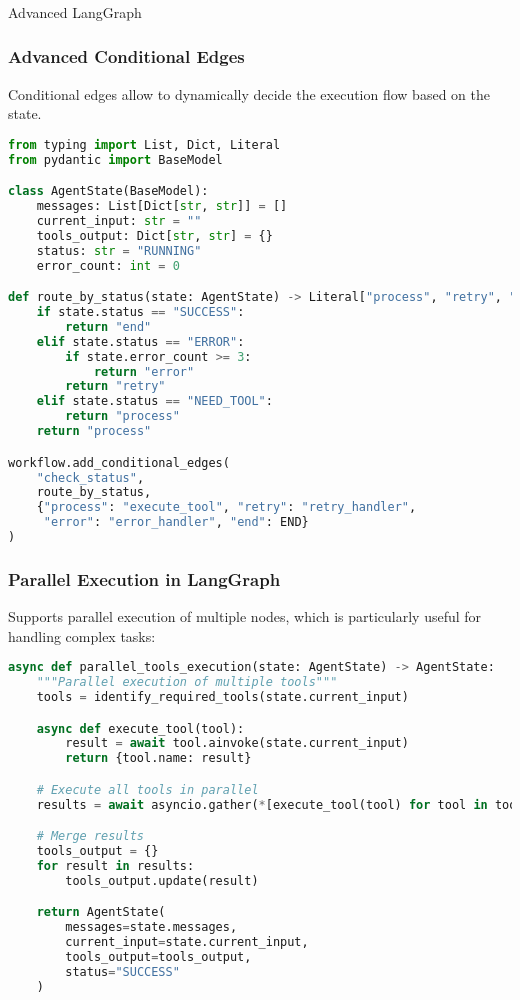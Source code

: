 \begin{frame}[fragile]\frametitle{}
\begin{center}
{\Large Advanced LangGraph}
\end{center}
\end{frame}


\begin{frame}[fragile]\frametitle{Advanced Conditional Edges}

Conditional edges allow to dynamically decide the execution flow based on the state.

      \begin{lstlisting}[language=Python, basicstyle=\tiny]
from typing import List, Dict, Literal
from pydantic import BaseModel

class AgentState(BaseModel):
    messages: List[Dict[str, str]] = []
    current_input: str = ""
    tools_output: Dict[str, str] = {}
    status: str = "RUNNING"
    error_count: int = 0

def route_by_status(state: AgentState) -> Literal["process", "retry", "error", "end"]:
    if state.status == "SUCCESS":
        return "end"
    elif state.status == "ERROR":
        if state.error_count >= 3:
            return "error"
        return "retry"
    elif state.status == "NEED_TOOL":
        return "process"
    return "process"

workflow.add_conditional_edges(
    "check_status",
    route_by_status,
    {"process": "execute_tool", "retry": "retry_handler", 
     "error": "error_handler", "end": END}
)
      \end{lstlisting}
\end{frame}

\begin{frame}[fragile]\frametitle{Parallel Execution in LangGraph}
Supports parallel execution of multiple nodes, which is particularly useful for handling complex tasks:

      \begin{lstlisting}[language=Python, basicstyle=\tiny]
async def parallel_tools_execution(state: AgentState) -> AgentState:
    """Parallel execution of multiple tools"""
    tools = identify_required_tools(state.current_input)

    async def execute_tool(tool):
        result = await tool.ainvoke(state.current_input)
        return {tool.name: result}

    # Execute all tools in parallel
    results = await asyncio.gather(*[execute_tool(tool) for tool in tools])

    # Merge results
    tools_output = {}
    for result in results:
        tools_output.update(result)

    return AgentState(
        messages=state.messages,
        current_input=state.current_input,
        tools_output=tools_output,
        status="SUCCESS"
    )
      \end{lstlisting}
\end{frame}


